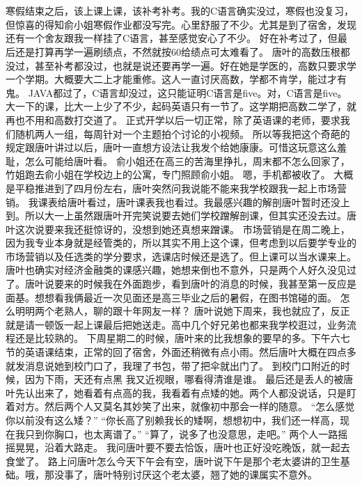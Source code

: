 \chapter{}
寒假结束之后，该上课上课，该补考补考。我的C语言确实没过，寒假也没复习，但惊喜的得知俞小姐寒假作业都没写完。心里舒服了不少。尤其是到了宿舍，发现还有一个舍友跟我一样挂了C语言，甚至感觉安心了不少。
好在补考过了，但最后还是打算再学一遍刷绩点，不然就按60给绩点可太难看了。
唐叶的高数压根都没过，甚至补考都没过，也就是说还要再学一遍。好在她是学医的，高数只要求学一个学期。大概要大二上才能重修。这人一直讨厌高数，学都不肯学，能过才有鬼。
JAVA都过了，C语言却没过，这只能证明C语言是five。对，C语言是five。
大一下的课，比大一上少了不少，起码英语只有一节了。这学期把高数二学了，就再也不用和高数打交道了。
正式开学以后一切正常，除了英语课的老师，要求我们随机两人一组，每周针对一个主题拍个讨论的小视频。
所以等我把这个奇葩的规定跟唐叶讲过以后，唐叶一直想方设法让我发个给她康康。可惜这玩意这么羞耻，怎么可能给唐叶看。
俞小姐还在高三的苦海里挣扎，周末都不怎么回家了，竹姐跑去俞小姐在学校边上的公寓，专门照顾俞小姐。
嗯，手机都被收了。
大概是平稳推进到了四月份左右，唐叶突然问我说能不能来我学校跟我一起上市场营销。
我课表给唐叶看过，唐叶课表我也看过。我最感兴趣的解剖唐叶暂时还没上到。所以大一上虽然跟唐叶开完笑说要去她们学校蹭解剖课，但其实还没去过。唐叶这次说要来我还挺惊讶的，没想到她还真想来蹭课。
市场营销是在周二晚上，因为我专业本身就是经管类的，所以其实不用上这个课，但考虑到以后要学专业的市场营销以及任选类的学分要求，选课店时候还是选了。但上课可以当水课来上。
唐叶也确实对经济金融类的课感兴趣，她想来倒也不意外，只是两个人好久没见过了。唐叶说要来的时候我在外面跑步，看到唐叶的消息的时候，我甚至第一反应是面基。想想看我俩最近一次见面还是高三毕业之后的暑假，在图书馆碰的面。
怎么明明两个老熟人，聊的跟十年网友一样？
唐叶说她下周来，我也就应了，反正就是请一顿饭一起上课最后把她送走。高中几个好兄弟也都来我学校逛过，业务流程还是比较熟的。
下周星期二的时候，唐叶来的比我想象的要早的多。下午六七节的英语课结束，正常的回了宿舍，外面还稍微有点小雨。然后唐叶大概在四点多就发消息说她到校门口了，我理了书包，带了把伞就出门了。
到校门口附近的时候，因为下雨，天还有点黑 我又近视眼，哪看得清谁是谁。
最后还是丢人的被唐叶先认出来了，她看着有点高的我，我看着有点矮的她。两个人都没说话，只是盯着对方。然后两个人又莫名其妙笑了出来，就像初中那会一样的随意。
“怎么感觉你以前没有这么矮？”
“你长高了别赖我长的矮啊，想想初中，我们还一样高，现在我只到你胸口，也太离谱了。”
“算了，说多了也没意思，走吧。”
两个人一路摇摇晃晃，沿着大路走。
我问唐叶要不要去恰饭，唐叶也正好没吃晚饭，就一起去食堂了。
路上问唐叶怎么今天下午会有空，唐叶说下午是那个老太婆讲的卫生基础。哦，那没事了，唐叶特别讨厌这个老太婆，翘了她的课属实不意外。
